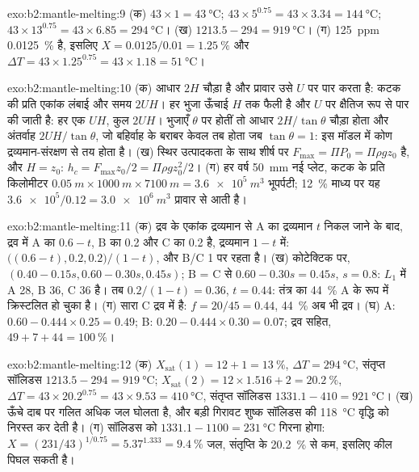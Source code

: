 \begin{solution}{exo:b2:mantle-melting:9}
(क) $43\times1 = \qty{43}{\celsius}$; $43\times5^{0.75} = 43\times3.34 =
\qty{144}{\celsius}$; $43\times13^{0.75} = 43\times6.85 = \qty{294}{\celsius}$।
(ख) $1213.5 - 294 = \qty{919}{\celsius}$। (ग) \qty{125}{ppm}
\qty{0.0125}{\percent} है, इसलिए $X = 0.0125/0.01 = \qty{1.25}{\percent}$ और $\Delta T =
43\times1.25^{0.75} = 43\times1.18 = \qty{51}{\celsius}$।
\end{solution}

\begin{solution}{exo:b2:mantle-melting:10}
(क) आधार $2H$ चौड़ा है और प्रावार उसे $U$ पर पार करता है: कटक की प्रति एकांक लंबाई
और समय $2UH$। हर भुजा ऊँचाई $H$ तक फैली है और $U$ पर क्षैतिज रूप से पार की जाती है:
हर एक $UH$, कुल $2UH$। भुजाएँ $\theta$ पर होतीं तो आधार
$2H/\tan\theta$ चौड़ा होता और अंतर्वाह $2UH/\tan\theta$, जो बहिर्वाह के बराबर केवल तब होता जब
$\tan\theta = 1$: इस मॉडल में कोण द्रव्यमान-संरक्षण से तय होता है। (ख)
स्थिर उत्पादकता के साथ शीर्ष पर  $F_{\max} = \Pi P_0 = \Pi\rho
g z_0$ है, और $H = z_0$: $h_c = F_{\max}z_0/2 = \Pi\rho g z_0^2/2$। (ग) हर वर्ष
\qty{50}{mm} नई प्लेट, कटक के प्रति किलोमीटर $\qty{0.05}{m}\times\qty{1000}{m}\times\qty{7100}{m} =
\qty{3.6e5}{m^3}$ भूपर्पटी; \qty{12}{\percent} माध्य 
पर यह $\num{3.6e5}/0.12 = \qty{3.0e6}{m^3}$ प्रावार से आती है।
\end{solution}

\begin{solution}{exo:b2:mantle-melting:11}
(क) द्रव के एकांक द्रव्यमान से A का द्रव्यमान $t$ निकल जाने के बाद, द्रव में A का $0.6 -
t$, B का 0.2 और C का 0.2 है, द्रव्यमान $1 - t$ में: $\big((0.6 - t), 0.2,
0.2\big)/(1 - t)$, और B/C 1 पर रहता है। (ख) कोटेक्टिक पर, $(0.40 - 0.15s, 0.60 -
0.30s, 0.45s)$; B = C से $0.60 - 0.30s = 0.45s$, $s = 0.8$: $L_1$ में A 28, B
36, C 36 है। तब $0.2/(1 - t) = 0.36$, $t = 0.44$: तंत्र का \qty{44}{\percent}
A के रूप में क्रिस्टलित हो चुका है। (ग) सारा C द्रव में है: $f = 20/45 = 0.44$,
\qty{44}{\percent} अब भी द्रव। (घ) A: $0.60 - 0.444\times0.25 = 0.49$; B: $0.20 -
0.444\times0.30 = 0.07$; द्रव सहित, $49 + 7 + 44 = \qty{100}{\percent}$।
\end{solution}

\begin{solution}{exo:b2:mantle-melting:12}
(क) $X_{\mathrm{sat}}(1) = 12 + 1 = \qty{13}{\percent}$, $\Delta T =
\qty{294}{\celsius}$, संतृप्त सॉलिडस $1213.5 - 294 = \qty{919}{\celsius}$;
$X_{\mathrm{sat}}(2) = 12\times1.516 + 2 = \qty{20.2}{\percent}$, $\Delta T =
43\times20.2^{0.75} = 43\times9.53 = \qty{410}{\celsius}$, संतृप्त सॉलिडस $1331.1
- 410 = \qty{921}{\celsius}$। (ख) ऊँचे दाब पर गलित अधिक जल घोलता है,
और बड़ी गिरावट शुष्क सॉलिडस की \qty{118}{\celsius} वृद्धि को निरस्त कर देती है।
(ग) सॉलिडस को $1331.1 - 1100 = \qty{231}{\celsius}$ गिरना होगा: $X =
(231/43)^{1/0.75} = 5.37^{1.333} = \qty{9.4}{\percent}$ जल, संतृप्ति के
\qty{20.2}{\percent} से कम, इसलिए कील पिघल सकती है।
\end{solution}

